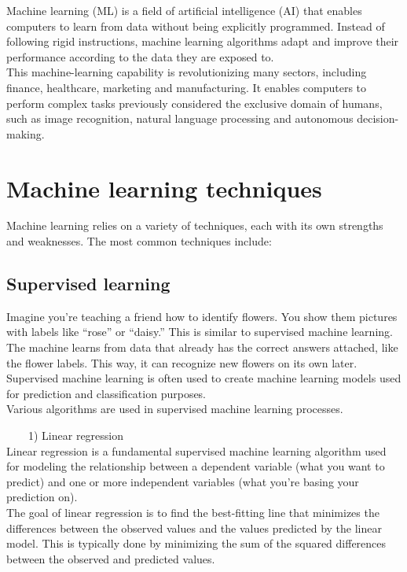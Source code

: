 \documentclass[
]{book}
\begin{document}
Machine learning (ML) is a field of artificial intelligence (AI) that enables computers to learn from data without being explicitly programmed. Instead of following rigid instructions, machine learning algorithms adapt and improve their performance according to the data they are exposed to.\\
This machine-learning capability is revolutionizing many sectors, including finance, healthcare, marketing and manufacturing. It enables computers to perform complex tasks previously considered the exclusive domain of humans, such as image recognition, natural language processing and autonomous decision-making.

\hypertarget{machine-learning-techniques}{%
\section{Machine learning techniques}\label{machine-learning-techniques}}

Machine learning relies on a variety of techniques, each with its own strengths and weaknesses. The most common techniques include:

\hypertarget{supervised-learning}{%
\subsection*{Supervised learning}\label{supervised-learning}}

Imagine you're teaching a friend how to identify flowers. You show them pictures with labels like ``rose'' or ``daisy.'' This is similar to supervised machine learning. The machine learns from data that already has the correct answers attached, like the flower labels. This way, it can recognize new flowers on its own later.\\
Supervised machine learning is often used to create machine learning models used for prediction and classification purposes.\\
Various algorithms are used in supervised machine learning processes.

~~~~1) Linear regression\\
Linear regression is a fundamental supervised machine learning algorithm used for modeling the relationship between a dependent variable (what you want to predict) and one or more independent variables (what you're basing your prediction on).\\
The goal of linear regression is to find the best-fitting line that minimizes the differences between the observed values and the values predicted by the linear model. This is typically done by minimizing the sum of the squared differences between the observed and predicted values.
\end{document}
